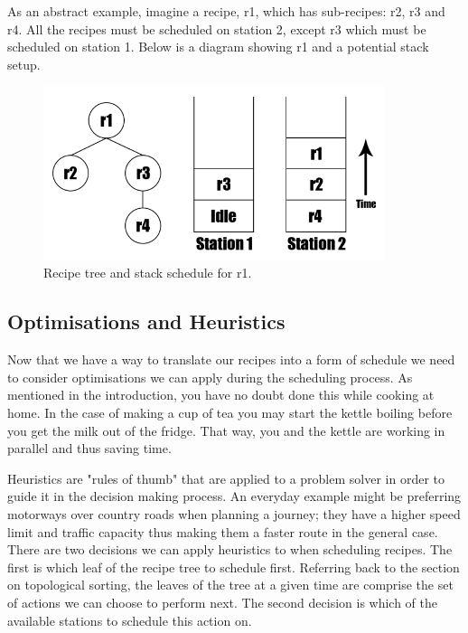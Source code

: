 \documentclass[11pt]{article}
\begin{document}
\medbreak

As an abstract example, imagine a recipe, r1, which has sub-recipes: r2, r3 and r4. All the
recipes must be scheduled on station 2, except r3 which must be scheduled on station 1.
Below is a diagram showing r1 and a potential stack setup.

\begin{figure}[h]
\includegraphics[width=10cm, keepaspectratio]{stacks.png}
\centering
\caption{Recipe tree and stack schedule for r1.}
\end{figure}

\subsection{Optimisations and Heuristics}

Now that we have a way to translate our recipes into a form of schedule we need to consider
optimisations we can apply during the scheduling process. As mentioned in the introduction,
you have no doubt done this while cooking at home. In the case of making a cup of tea you
may start the kettle boiling before you get the milk out of the fridge. That way, you and
the kettle are working in parallel and thus saving time.

\medbreak

Heuristics are "rules of thumb" that are applied to a problem solver in order to guide it
in the decision making process. An everyday example might be preferring motorways over country roads
when planning a journey; they have a higher speed limit and traffic capacity thus making
them a faster route in the general case. There are two decisions we can apply heuristics to
when scheduling recipes. The first is which leaf of the recipe tree to schedule first.
Referring back to the section on topological sorting, the leaves of the tree at a given time
are comprise the set of actions we can choose to perform next. The second decision is which
of the available stations to schedule this action on.
\end{document}
